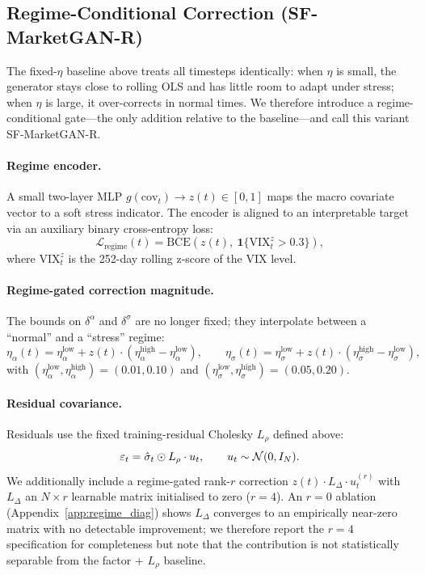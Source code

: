 \subsection{Regime-Conditional Correction (SF-MarketGAN-R)}
\label{sec:regime_method}
The fixed-$\eta$ baseline above treats all timesteps identically: when $\eta$ is small, the generator stays close to rolling OLS and has little room to adapt under stress; when $\eta$ is large, it over-corrects in normal times. We therefore introduce a regime-conditional gate---the only addition relative to the baseline---and call this variant SF-MarketGAN-R.

\paragraph{Regime encoder.}
A small two-layer MLP $g(\text{cov}_t) \to z(t) \in [0, 1]$ maps the macro covariate vector to a soft stress indicator. The encoder is aligned to an interpretable target via an auxiliary binary cross-entropy loss:
\begin{equation}
    \mathcal{L}_\text{regime}(t) = \text{BCE}\!\left(z(t),\ \mathbf{1}\{\text{VIX}^z_t > 0.3\}\right),
\end{equation}
where $\text{VIX}^z_t$ is the 252-day rolling z-score of the VIX level.

\paragraph{Regime-gated correction magnitude.}
The bounds on $\delta^\alpha$ and $\delta^\sigma$ are no longer fixed; they interpolate between a ``normal'' and a ``stress'' regime:
\begin{equation}
    \eta_\alpha(t) = \eta_\alpha^\text{low} + z(t)\cdot(\eta_\alpha^\text{high} - \eta_\alpha^\text{low}),\qquad
    \eta_\sigma(t) = \eta_\sigma^\text{low} + z(t)\cdot(\eta_\sigma^\text{high} - \eta_\sigma^\text{low}),
\end{equation}
with $(\eta_\alpha^\text{low},\eta_\alpha^\text{high}) = (0.01, 0.10)$ and $(\eta_\sigma^\text{low},\eta_\sigma^\text{high}) = (0.05, 0.20)$.

\paragraph{Residual covariance.}
Residuals use the fixed training-residual Cholesky $L_\rho$ defined above:
\begin{equation}
    \varepsilon_t = \hat{\sigma}_t \odot L_\rho \cdot u_t,\qquad u_t \sim \mathcal{N}(0, I_N).
\end{equation}
We additionally include a regime-gated rank-$r$ correction $z(t) \cdot L_\Delta \cdot u_t^{(r)}$ with $L_\Delta$ an $N \times r$ learnable matrix initialised to zero ($r=4$). An $r=0$ ablation (Appendix~\ref{app:regime_diag}) shows $L_\Delta$ converges to an empirically near-zero matrix with no detectable improvement; we therefore report the $r=4$ specification for completeness but note that the contribution is not statistically separable from the factor + $L_\rho$ baseline.

